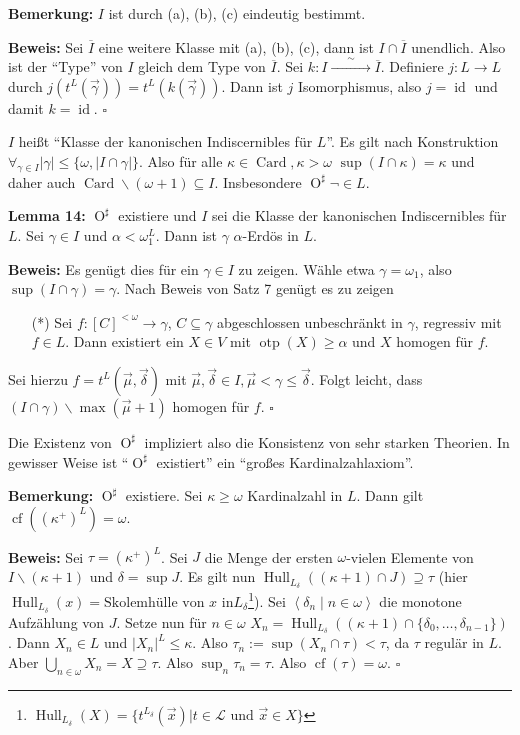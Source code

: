 \documentclass[a4paper,fontsize=11pt]{scrartcl}
\newcommand{\simrightarrow}{\xrightarrow{\phantom{\sim}\sim\phantom{\sim}}}
\newcommand{\osharp}{\operatorname{O}^\sharp}
\newcommand{\Card}{\operatorname{Card}}
\newcommand{\cf}{\operatorname{cf}}
\newcommand{\otp}{\operatorname{otp}}
\newcommand{\id}{\operatorname{id}}
\newcommand{\Hull}{\operatorname{Hull}}
\renewcommand{\bar}[1]{\overline{#1}}
\begin{document}
{\bf Bemerkung:} $I$ ist durch (a), (b), (c) eindeutig bestimmt.

{\bf Beweis:} Sei $\bar{I}$ eine weitere Klasse mit (a), (b), (c),
dann ist $I\cap\bar{I}$ unendlich. Also ist der ``Type'' von $I$
gleich dem Type von $\bar{I}$. Sei
$k:I\simrightarrow\bar{I}$. Definiere $j:L\rightarrow L$
durch $j(t^L(\vec{\gamma}))=t^L(k(\vec{\gamma}))$. Dann ist $j$
Isomorphismus, also $j=\id$ und damit $k=\id$.
\hfill $\square$

$I$ heißt ``Klasse der kanonischen Indiscernibles für $L$''. Es gilt
nach Konstruktion $\forall_{\gamma\in I}
|\gamma|\le\{\omega,|I\cap\gamma|\}$. Also für alle
$\kappa\in\Card,\kappa > \omega$ $\sup(I\cap\kappa)=\kappa$ und daher
auch $\Card\backslash(\omega+1)\subseteq I$. Insbesondere
$\osharp\lnot\in L$.

{\bf Lemma 14:} $\osharp$ existiere und $I$ sei die Klasse der
kanonischen Indiscernibles für $L$. Sei $\gamma\in I$ und
$\alpha<\omega_1^L$. Dann ist $\gamma$ $\alpha$-Erdös in $L$.

{\bf Beweis:} Es genügt dies für ein $\gamma\in I$ zu zeigen. Wähle
etwa $\gamma=\omega_1$, also $\sup(I\cap\gamma) = \gamma$. Nach Beweis
von Satz 7 genügt es zu zeigen

\begin{itemize}
  \item[(*)] Sei $f:[C]^{<\omega}\rightarrow\gamma$,
    $C\subseteq\gamma$ abgeschlossen unbeschränkt in $\gamma$,
    regressiv mit $f\in L$. Dann existiert ein $X\in V$ mit
    $\otp(X)\ge\alpha$ und $X$ homogen für $f$.
\end{itemize}

Sei hierzu $f=t^L(\vec{\mu},\vec{\delta})$ mit
$\vec{\mu},\vec{\delta}\in I,\vec{\mu}<\gamma\le\vec{\delta}$. Folgt
leicht, dass $(I\cap\gamma)\backslash\max(\vec{\mu}+1)$ homogen für
$f$.
\hfill $\square$

Die Existenz von $\osharp$ impliziert also die Konsistenz von sehr
starken Theorien. In gewisser Weise ist ``$\osharp$ existiert'' ein
``großes Kardinalzahlaxiom''.

{\bf Bemerkung:} $\osharp$ existiere. Sei $\kappa\ge\omega$
Kardinalzahl in $L$. Dann gilt $\cf((\kappa^+)^L)=\omega$.

{\bf Beweis:} Sei $\tau=(\kappa^+)^L$. Sei $J$ die Menge der ersten $\omega$-vielen Elemente von $I\backslash(\kappa+1)$ und $\delta=\sup J$. Es gilt
nun $\Hull_{L_\delta} ((\kappa+1)\cap J)\supseteq\tau$ (hier $\Hull_{L_\delta}(x)=\mbox{Skolemhülle von }x\mbox{ in
}L_\delta$\footnote{$\Hull_{L_\delta}(X)=\{t^{L_\delta}(\vec{x})|t\in\mathcal{L}\mbox{ und }\vec{x}\in X\}$}). Sei $\left<\delta_n\mid
n\in\omega\right>$ die monotone Aufzählung von $J$. Setze nun für $n\in\omega$
$X_n=\Hull_{L_\delta}((\kappa+1)\cap\{\delta_0,\ldots,\delta_{n-1}\})$. Dann $X_n\in L$ und $|X_n|^L\le\kappa$. Also $\tau_n:=\sup(X_n\cap\tau)<\tau$,
da $\tau$ regulär in $L$. Aber $\bigcup_{n\in\omega}X_n=X\supseteq\tau$. Also $\sup_n\tau_n=\tau$. Also $\cf(\tau)=\omega$.  \hfill $\square$
\end{document}
